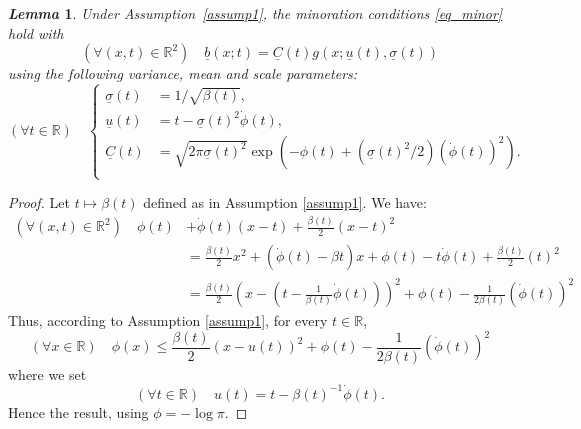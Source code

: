 \documentclass[review]{elsarticle}
\newtheorem{lemma}{\em Lemma}
\newcommand{\bR}{\mathbb{R}}
\begin{document}
\begin{lemma}
\label{lem:ass1}
Under Assumption~\ref{assump1}, the minoration conditions \eqref{eq_minor} hold with
\begin{equation}
(\forall (x,t) \in \bR^2) \quad \underline{b}(x;t) = 
\underline{C}(t) g(x; \underline{u}(t), \underline{\sigma}(t))
\end{equation}
using the following variance, mean and scale parameters:
\begin{equation}
(\forall t \in \bR) \quad
\begin{cases}
\underline{\sigma}(t) & = 1/\sqrt{\beta(t)}, \\
\underline{u}(t) & = t -\underline{\sigma}(t)^2 \dot{\phi}(t), \\
\underline{C}(t) & = \sqrt{2 \pi \underline{\sigma}(t)^2} \exp\left(- \phi(t) + (\underline{\sigma}(t)^2/2) (\dot{\phi}(t))^2\right). \\
\end{cases}
\end{equation}
\end{lemma}

\begin{proof}  
Let $t \mapsto \beta(t)$ defined as in Assumption \ref{assump1}. We have:
\begin{align}
(\forall (x,t) \in \bR^2) \quad \phi(t) &+ \dot{\phi}(t) (x - t) + \frac{\beta(t)}{2} (x - t)^2 \\
& = \frac{\beta(t)}{2} x^2 + (\dot{\phi}(t) - \beta t) x + \phi(t) - t \dot{\phi}(t) + \frac{\beta(t)}{2} (t)^2\\
& = \frac{\beta(t)}{2} \left(x - (t - \frac{1}{\beta(t)} \dot{\phi}(t)) \right)^2 + \phi(t) - \frac{1}{2 \beta(t)} (\dot{\phi}(t))^2
\end{align}
Thus, according to Assumption \ref{assump1}, for every $t \in \bR$,
\begin{equation}
(\forall x \in \bR) \quad
\phi(x) \leq \frac{\beta(t)}{2} (x - u(t))^2 + \phi(t) - \frac{1}{2 \beta(t)} (\dot{\phi}(t))^2
\end{equation}
where we set
\begin{equation}
(\forall t \in \bR) \quad u(t) = t - \beta(t)^{-1} \dot{\phi}(t).
\end{equation}
Hence the result, using $\phi =- \log \pi$.
\end{proof}
\end{document}
